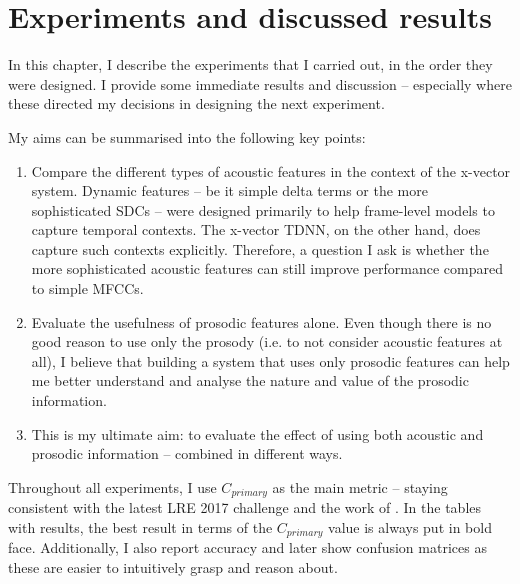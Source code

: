 \documentclass[bsc,frontabs,twoside,singlespacing,parskip,deptreport]{infthesis}
\begin{document}
\chapter{Experiments and discussed results}{
  \label{chap:Experiments}

  In this chapter, I describe the experiments that I carried out, in the order they were designed. I provide some immediate results and discussion -- especially where these directed my decisions in designing the next experiment.

  My aims can be summarised into the following key points:
  \begin{enumerate}
    \item {Compare the different types of acoustic features in the context of the x-vector system. Dynamic features -- be it simple delta terms or the more sophisticated SDCs -- were designed primarily to help frame-level models to capture temporal contexts. The x-vector TDNN, on the other hand, does capture such contexts explicitly. Therefore, a question I ask is whether the more sophisticated acoustic features can still improve performance compared to simple MFCCs.}
    
    \item {Evaluate the usefulness of prosodic features alone. Even though there is no good reason to use only the prosody (i.e. to not consider acoustic features at all), I believe that building a system that uses only prosodic features can help me better understand and analyse the nature and value of the prosodic information.}
    
    \item {This is my ultimate aim: to evaluate the effect of using both acoustic and prosodic information -- combined in different ways.}
  \end{enumerate}


  Throughout all experiments, I use $C_{primary}$ as the main metric -- staying consistent with the latest LRE 2017 challenge and the work of \citet{Snyder_et_al_2018}. In the tables with results, the best result in terms of the $C_{primary}$ value is always put in bold face. Additionally, I also report accuracy and later show confusion matrices as these are easier to intuitively grasp and reason about.

}
\end{document}
